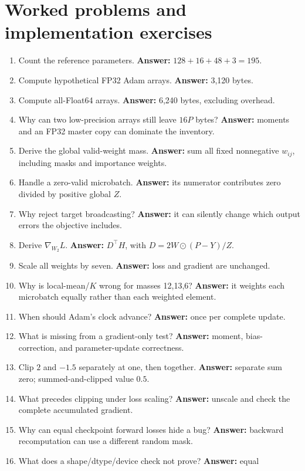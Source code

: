 \section{Worked problems and implementation exercises}
\begin{enumerate}
\item Count the reference parameters. \textbf{Answer:} $128+16+48+3=195$.
\item Compute hypothetical FP32 Adam arrays. \textbf{Answer:} 3,120 bytes.
\item Compute all-Float64 arrays. \textbf{Answer:} 6,240 bytes, excluding overhead.
\item Why can two low-precision arrays still leave $16P$ bytes?
\textbf{Answer:} moments and an FP32 master copy can dominate the inventory.
\item Derive the global valid-weight mass. \textbf{Answer:} sum all fixed
nonnegative $w_{ij}$, including masks and importance weights.
\item Handle a zero-valid microbatch. \textbf{Answer:} its numerator contributes
zero divided by positive global $Z$.
\item Why reject target broadcasting? \textbf{Answer:} it can silently change
which output errors the objective includes.
\item Derive $\nabla_{W_2}L$. \textbf{Answer:} $D^\top H$, with
$D=2W\odot(P-Y)/Z$.
\item Scale all weights by seven. \textbf{Answer:} loss and gradient are unchanged.
\item Why is local-mean/$K$ wrong for masses 12,13,6?
\textbf{Answer:} it weights each microbatch equally rather than each weighted element.
\item When should Adam's clock advance? \textbf{Answer:} once per complete update.
\item What is missing from a gradient-only test? \textbf{Answer:} moment,
bias-correction, and parameter-update correctness.
\item Clip $2$ and $-1.5$ separately at one, then together.
\textbf{Answer:} separate sum zero; summed-and-clipped value $0.5$.
\item What precedes clipping under loss scaling? \textbf{Answer:} unscale and
check the complete accumulated gradient.
\item Why can equal checkpoint forward losses hide a bug?
\textbf{Answer:} backward recomputation can use a different random mask.
\item What does a shape/dtype/device check not prove? \textbf{Answer:} equal

\end{enumerate}
